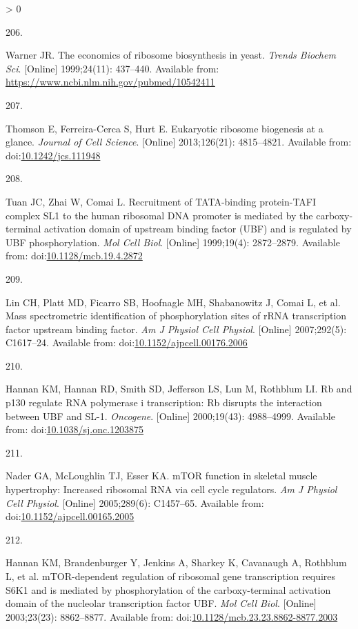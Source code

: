 \documentclass[twoside,10pt]{gihclass} %
\newlength{\cslhangindent}
\newlength{\csllabelwidth}
\newenvironment{CSLReferences}[3] %
 {%
  \setlength{\parindent}{0pt}
  \ifodd #1 \everypar{\setlength{\hangindent}{\cslhangindent}}\ignorespaces\fi
  \ifnum #2 > 0
  \setlength{\parskip}{#2\baselineskip}
  \fi
 }%
 {}
\newcommand{\CSLLeftMargin}[1]{\parbox[t]{\maxof{\widthof{#1}}{\csllabelwidth}}{#1}}
\newcommand{\CSLRightInline}[1]{\parbox[t]{\linewidth}{#1}}
\begin{document}
\begin{CSLReferences}{0}{0}
\leavevmode\hypertarget{ref-RN1920}{}%
\CSLLeftMargin{206. }
\CSLRightInline{Warner JR. The economics of ribosome biosynthesis in yeast. \emph{Trends Biochem Sci}. {[}Online{]} 1999;24(11): 437--440. Available from: \url{https://www.ncbi.nlm.nih.gov/pubmed/10542411}}

\leavevmode\hypertarget{ref-RN1940}{}%
\CSLLeftMargin{207. }
\CSLRightInline{Thomson E, Ferreira-Cerca S, Hurt E. Eukaryotic ribosome biogenesis at a glance. \emph{Journal of Cell Science}. {[}Online{]} 2013;126(21): 4815--4821. Available from: doi:\href{https://doi.org/10.1242/jcs.111948}{10.1242/jcs.111948}}

\leavevmode\hypertarget{ref-RN2582}{}%
\CSLLeftMargin{208. }
\CSLRightInline{Tuan JC, Zhai W, Comai L. Recruitment of TATA-binding protein-TAFI complex SL1 to the human ribosomal DNA promoter is mediated by the carboxy-terminal activation domain of upstream binding factor (UBF) and is regulated by UBF phosphorylation. \emph{Mol Cell Biol}. {[}Online{]} 1999;19(4): 2872--2879. Available from: doi:\href{https://doi.org/10.1128/mcb.19.4.2872}{10.1128/mcb.19.4.2872}}

\leavevmode\hypertarget{ref-RN2563}{}%
\CSLLeftMargin{209. }
\CSLRightInline{Lin CH, Platt MD, Ficarro SB, Hoofnagle MH, Shabanowitz J, Comai L, et al. Mass spectrometric identification of phosphorylation sites of rRNA transcription factor upstream binding factor. \emph{Am J Physiol Cell Physiol}. {[}Online{]} 2007;292(5): C1617--24. Available from: doi:\href{https://doi.org/10.1152/ajpcell.00176.2006}{10.1152/ajpcell.00176.2006}}

\leavevmode\hypertarget{ref-RN2213}{}%
\CSLLeftMargin{210. }
\CSLRightInline{Hannan KM, Hannan RD, Smith SD, Jefferson LS, Lun M, Rothblum LI. Rb and p130 regulate RNA polymerase i transcription: Rb disrupts the interaction between UBF and SL-1. \emph{Oncogene}. {[}Online{]} 2000;19(43): 4988--4999. Available from: doi:\href{https://doi.org/10.1038/sj.onc.1203875}{10.1038/sj.onc.1203875}}

\leavevmode\hypertarget{ref-RN1632}{}%
\CSLLeftMargin{211. }
\CSLRightInline{Nader GA, McLoughlin TJ, Esser KA. mTOR function in skeletal muscle hypertrophy: Increased ribosomal RNA via cell cycle regulators. \emph{Am J Physiol Cell Physiol}. {[}Online{]} 2005;289(6): C1457--65. Available from: doi:\href{https://doi.org/10.1152/ajpcell.00165.2005}{10.1152/ajpcell.00165.2005}}

\leavevmode\hypertarget{ref-RN2564}{}%
\CSLLeftMargin{212. }
\CSLRightInline{Hannan KM, Brandenburger Y, Jenkins A, Sharkey K, Cavanaugh A, Rothblum L, et al. mTOR-dependent regulation of ribosomal gene transcription requires S6K1 and is mediated by phosphorylation of the carboxy-terminal activation domain of the nucleolar transcription factor UBF. \emph{Mol Cell Biol}. {[}Online{]} 2003;23(23): 8862--8877. Available from: doi:\href{https://doi.org/10.1128/mcb.23.23.8862-8877.2003}{10.1128/mcb.23.23.8862-8877.2003}}


\end{CSLReferences}
\end{document}
